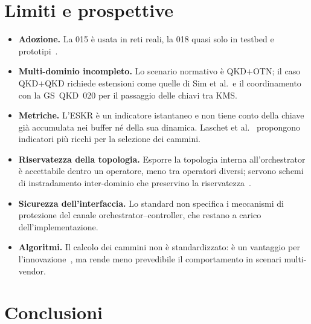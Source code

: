 \section{Limiti e prospettive}
\label{sec:limiti}

\begin{itemize}
  \item \textbf{Adozione.} La 015 è usata in reti reali, la 018 quasi solo
        in testbed e prototipi~\cite{madqci2024}.
  \item \textbf{Multi-dominio incompleto.} Lo scenario normativo è
        QKD$+$OTN; il caso QKD$+$QKD richiede estensioni come quelle di
        Sim et al.\ e il coordinamento con la GS~QKD~020 per il passaggio
        delle chiavi tra KMS.
  \item \textbf{Metriche.} L'ESKR è un indicatore istantaneo e non tiene
        conto della chiave già accumulata nei buffer né della sua
        dinamica. Laschet et al.~\cite{laschet2026} propongono indicatori
        più ricchi per la selezione dei cammini.
  \item \textbf{Riservatezza della topologia.} Esporre la topologia
        interna all'orchestrator è accettabile dentro un operatore, meno
        tra operatori diversi; servono schemi di instradamento inter-dominio
        che preservino la riservatezza~\cite{laschet2026,interconnect2026}.
  \item \textbf{Sicurezza dell'interfaccia.} Lo standard non specifica i
        meccanismi di protezione del canale orchestrator–controller, che
        restano a carico dell'implementazione.
  \item \textbf{Algoritmi.} Il calcolo dei cammini non è standardizzato:
        è un vantaggio per l'innovazione~\cite{routing2024,mendez2026}, ma
        rende meno prevedibile il comportamento in scenari multi-vendor.
\end{itemize}

\section{Conclusioni}
\label{sec:conclusioni}

